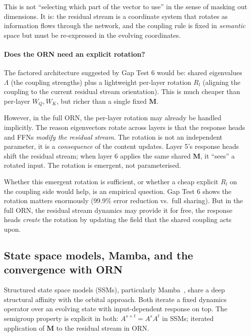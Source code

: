 \documentclass[11pt, a4paper]{article}
\newcommand{\M}{\mathbf{M}}
\theoremstyle{remark}
\begin{document}
This is not ``selecting which part of the vector to use'' in the sense of masking out dimensions.
It is: the residual stream is a coordinate system that rotates as information flows through the network, and the coupling rule is fixed in \emph{semantic} space but must be re-expressed in the evolving coordinates.

\paragraph{Does the ORN need an explicit rotation?}
The factored architecture suggested by Gap Test 6 would be: shared eigenvalues $\Lambda$ (the coupling strengths) plus a lightweight per-layer rotation $R_l$ (aligning the coupling to the current residual stream orientation).
This is much cheaper than per-layer $W_Q, W_K$, but richer than a single fixed $\M$.

However, in the full ORN, the per-layer rotation may already be handled implicitly.
The reason eigenvectors rotate across layers is that the response heads and FFNs \emph{modify the residual stream}.
The rotation is not an independent parameter, it is a \emph{consequence} of the content updates.
Layer 5's response heads shift the residual stream; when layer 6 applies the same shared $\M$, it ``sees'' a rotated input.
The rotation is emergent, not parameterised.

Whether this emergent rotation is sufficient, or whether a cheap explicit $R_l$ on the coupling side would help, is an empirical question.
Gap Test 6 shows the rotation matters enormously (99.9\% error reduction vs.\ full sharing).
But in the full ORN, the residual stream dynamics may provide it for free, the response heads \emph{create} the rotation by updating the field that the shared coupling acts upon.

\subsection*{State space models, Mamba, and the convergence with ORN}

Structured state space models (SSMs), particularly Mamba~\cite{gu2023mamba}, share a deep structural affinity with the orbital approach.
Both iterate a fixed dynamics operator over an evolving state with input-dependent response on top.
The semigroup property is explicit in both: $A^{s+t} = A^s A^t$ in SSMs; iterated application of $\M$ to the residual stream in ORN.
\end{document}
